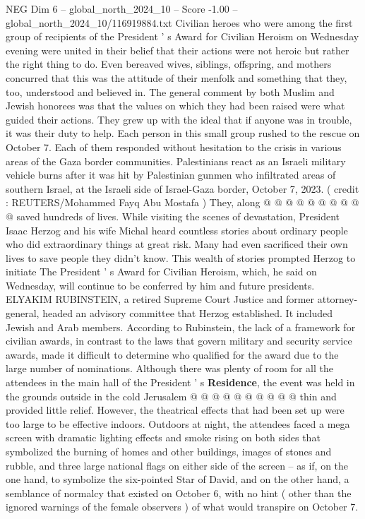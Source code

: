 \begin{textsample}{NEG Dim 6 – global\_north\_2024\_10 – Score -1.00 – global\_north\_2024\_10/116919884.txt}  \label{ex:f6_neg_082}
Civilian heroes who were among the first group of recipients of the President ' s Award for Civilian Heroism on Wednesday evening were united in their belief that their actions were not heroic but rather the right thing to do.
Even bereaved wives, siblings, offspring, and mothers concurred that this was the attitude of their menfolk and something that they, too, understood and believed in.
The general comment by both Muslim and Jewish honorees was that the values on which they had been raised were what guided their actions.
They grew up with the ideal that if anyone was in trouble, it was their duty to help.
Each person in this small group rushed to the rescue on October 7.
Each of them responded without hesitation to the crisis in various areas of the Gaza border communities.
Palestinians react as an Israeli military vehicle burns after it was hit by Palestinian gunmen who infiltrated areas of southern Israel, at the Israeli side of Israel-Gaza border, October 7, 2023. ( credit : REUTERS/Mohammed Fayq Abu Mostafa ) They, along @ @ @ @ @ @ @ @ @ @ saved hundreds of lives.
While visiting the scenes of devastation, President Isaac Herzog and his wife Michal heard countless stories about ordinary people who did extraordinary things at great risk.
Many had even sacrificed their own lives to save people they didn't know.
This wealth of stories prompted Herzog to initiate The President ' s Award for Civilian Heroism, which, he said on Wednesday, will continue to be conferred by him and future presidents.
ELYAKIM RUBINSTEIN, a retired Supreme Court Justice and former attorney-general, headed an advisory committee that Herzog established.
It included Jewish and Arab members.
According to Rubinstein, the lack of a framework for civilian awards, in contrast to the laws that govern military and security service awards, made it difficult to determine who qualified for the award due to the large number of nominations.
Although there was plenty of room for all the attendees in the main hall of the President ' s \textbf{Residence}, the event was held in the grounds outside in the cold Jerusalem @ @ @ @ @ @ @ @ @ @ thin and provided little relief.
However, the theatrical effects that had been set up were too large to be effective indoors.
Outdoors at night, the attendees faced a mega screen with dramatic lighting effects and smoke rising on both sides that symbolized the burning of homes and other buildings, images of stones and rubble, and three large national flags on either side of the screen -- as if, on the one hand, to symbolize the six-pointed Star of David, and on the other hand, a semblance of normalcy that existed on October 6, with no hint ( other than the ignored warnings of the female observers ) of what would transpire on October 7.

\end{textsample}
